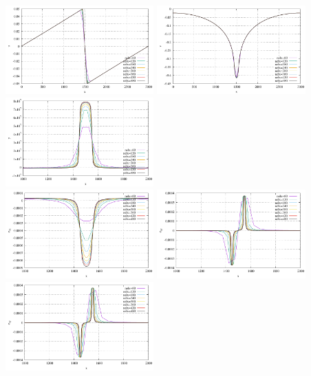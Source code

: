 \begin{center}
\includegraphics[width=5.7cm]{python_codes/fieldstone_34/results/exp4/top_profile_u.pdf}
\includegraphics[width=5.7cm]{python_codes/fieldstone_34/results/exp4/top_profile_v.pdf}
\includegraphics[width=5.7cm]{python_codes/fieldstone_34/results/exp4/top_profile_p.pdf}\\
\includegraphics[width=5.7cm]{python_codes/fieldstone_34/results/exp4/top_profile_exx.pdf}
\includegraphics[width=5.7cm]{python_codes/fieldstone_34/results/exp4/top_profile_eyy.pdf}
\includegraphics[width=5.7cm]{python_codes/fieldstone_34/results/exp4/top_profile_exy.pdf}\\

\end{center}
